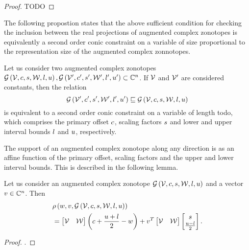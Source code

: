 %
\begin{proof}
  {\color{red} TODO}
\end{proof}
%
The following propostion states that the above sufficient condition
for checking the inclusion between the real projections of augmented
complex zonotopes is equivalently a second order conic constraint on a
variable of size proportional to the representation size of the
augmented complex zonnotopes.
%
\begin{proposition}
Let us consider two augmented complex zonotopes\\
$\mathcal{G}\left(\mathcal{V},c,s,\mathcal{W},l,u\right),
\mathcal{G}\left(\mathcal{V}^\prime,c^\prime,s^\prime,\mathcal{W}^\prime,l^\prime,u^\prime\right)\subset\mathbb{C}^n$.
If $\mathcal{V}$ and $\mathcal{V}^\prime$ are considered constants, then the
relation
%
\[
\mathcal{G}\left(\mathcal{V}^\prime,c^\prime,s^\prime,\mathcal{W}^\prime,l^\prime,u^\prime\right) \sqsubseteq
 \mathcal{G}\left(\mathcal{V},c,s,\mathcal{W},l,u\right)
\]
%
is equivalent to a second order conic constraint on a variable of
length {\color{red} todo}, which comprises the primary offset $c$, scaling
factors $s$ and lower and upper interval bounds $l$ and $u$,
respectively.
\end{proposition}
%
The support of an augmented complex zonotope along any direction is as
an affine function of the primary offset, scaling factors and the
upper and lower interval bounds.  This is described in the following
lemma.
%
\begin{lemma}
Let us consider an augmented complex zonotope
$\mathcal{G}\left(\mathcal{V},c,s,\mathcal{W},l,u\right)$ and a vector
$v\in\mathbb{C}^n$.  Then
%
\begin{align*}
  & \rho\left(w,v,\mathcal{G}\left(\mathcal{V},c,s,\mathcal{W},l,u\right)\right)\\
  & = \left[\begin{matrix}\mathcal{V} &
    \mathcal{W}\end{matrix}\right]\left(c+\frac{u+l}{2}-w\right)+v^T\left[\begin{matrix}\mathcal{V} & \mathcal{W}\end{matrix}\right]\left[\begin{matrix}s\\\frac{u-l}{2}\end{matrix}\right].
\end{align*}
%
\end{lemma}
%
\begin{proof}
{\color{red} }.
\end{proof}
%


